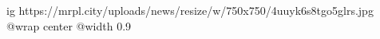  
 
 
 
 

\ifcmt
  ig https://mrpl.city/uploads/news/resize/w/750x750/4uuyk6s8tgo5glrs.jpg
  @wrap center
  @width 0.9
\fi
